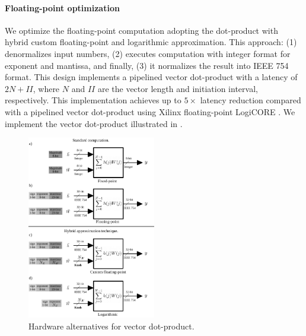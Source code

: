 \paragraph{Floating-point optimization}
We optimize the floating-point computation adopting the dot-product with hybrid custom floating-point and logarithmic approximation\cite{nevarez2021accelerating}. This approach: (1) denormalizes input numbers, (2) executes computation with integer format for exponent and mantissa, and finally, (3) it normalizes the result into IEEE 754 format. This design implements a pipelined vector dot-product with a latency of $2N+II$, where $N$ and $II$ are the vector length and initiation interval, respectively. This implementation achieves up to $5\times$ latency reduction compared with a pipelined vector dot-product using Xilinx floating-point LogiCORE \cite{nevarez2021accelerating}. We implement the vector dot-product illustrated in .

\begin{figure}[t!]
	\centering
	\includegraphics[width=0.5\textwidth]{../figures/dot-product_unit.pdf}
	\caption{Hardware alternatives for vector dot-product.}
	\label{fig:dot_product}
\end{figure}



